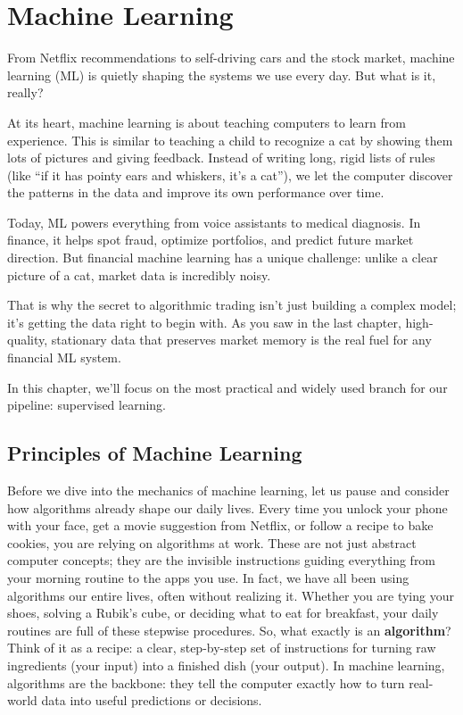 ﻿
\chapter{Machine Learning}

From Netflix recommendations to self-driving cars and the stock market, machine learning (ML) is quietly shaping the systems we use every day. But what is it, really?

At its heart, machine learning is about teaching computers to learn from experience. This is similar to teaching a child to recognize a cat by showing them lots of pictures and giving feedback. Instead of writing long, rigid lists of rules (like ``if it has pointy ears and whiskers, it's a cat''), we let the computer discover the patterns in the data and improve its own performance over time.

Today, ML powers everything from voice assistants to medical diagnosis. In finance, it helps spot fraud, optimize portfolios, and
predict future market direction. But financial machine learning has a unique challenge: unlike a clear picture of a cat, market data
is incredibly noisy.

That is why the secret to algorithmic trading isn't just building a complex model; it's getting the data right to begin with. As you saw in the last chapter, high-quality, stationary data that preserves market memory is the real fuel for
any financial ML system.

In this chapter, we'll focus on the most practical and widely used branch for our pipeline: supervised learning. 

\section{Principles of Machine Learning}\label{sec:principles}

Before we dive into the mechanics of machine learning, let us pause and consider how algorithms already shape our daily lives.
Every time you unlock your phone with your face, get a movie suggestion from Netflix, or follow a recipe to bake cookies, you are relying on algorithms at work.
These are not just abstract computer concepts; they are the invisible instructions guiding everything from your morning routine to the apps you use.
In fact, we have all been using algorithms our entire lives, often without realizing it. Whether you are tying your shoes, solving a Rubik's cube, or deciding what to eat for breakfast, your daily routines are full of these stepwise procedures.
So, what exactly is an \textbf{algorithm}? Think of it as a recipe: a clear, step-by-step set of instructions for turning raw ingredients (your input) into a finished dish (your output).
In machine learning, algorithms are the backbone: they tell the computer exactly how to turn real-world data into useful predictions or decisions. 

